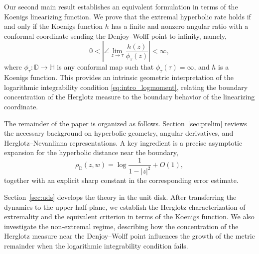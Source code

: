 \documentclass[12pt]{amsart}
\numberwithin{equation}{section}
\theoremstyle{plain}
\theoremstyle{definition}
\begin{document}
Our second main result establishes an equivalent formulation in terms of
the Koenigs linearizing function. We prove that the extremal hyperbolic
rate holds if and only if the Koenigs function $h$ has a finite and
nonzero angular ratio with a conformal coordinate sending the
Denjoy--Wolff point to infinity, namely,
\begin{equation*}
0<
\left|
\angle\lim_{z\to\tau}
\frac{h(z)}{\phi_\tau(z)}
\right|
<
\infty,
\end{equation*}
where $\phi_\tau:\mathbb D\to\mathbb H$ is any conformal map such that   $\phi_\tau(\tau)=\infty$, and $h$ is a Koenigs function. This provides an intrinsic geometric interpretation of the logarithmic integrability condition
\eqref{eq:intro_logmoment}, relating the boundary concentration of the
Herglotz measure to the boundary behavior of the linearizing coordinate.

The remainder of the paper is organized as follows.
Section~\ref{sec:prelim} reviews the necessary background on hyperbolic
geometry, angular derivatives, and Herglotz--Nevanlinna representations.
A key ingredient is a precise asymptotic expansion for the hyperbolic
distance near the boundary,
\begin{equation*}
\rho_{\mathbb D}(z,w)
=
\log\frac1{1-|z|^2}
+
O(1),
\end{equation*}
together with an explicit sharp constant in the corresponding error
estimate.

Section~\ref{sec:uds} develops the theory in the unit disk. After
transferring the dynamics to the upper half-plane, we establish the
Herglotz characterization of extremality and the equivalent criterion in
terms of the Koenigs function. We also investigate the non-extremal
regime, describing how the concentration of the Herglotz measure near the
Denjoy--Wolff point influences the growth of the metric remainder when
the logarithmic integrability condition fails.
\end{document}
